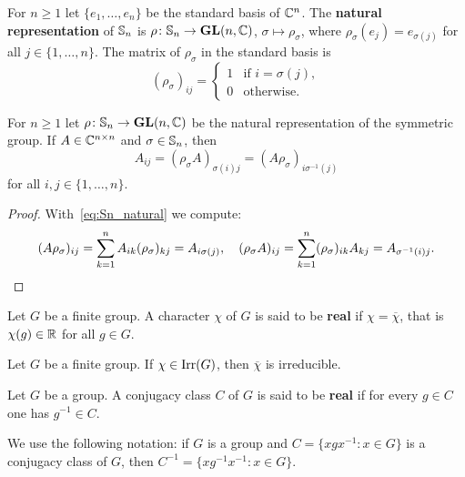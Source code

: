 For $n\geq1$ let $\{e_1,\dots,e_n\}$ be the standard basis of $\mathbb{C}^n$.  
The \textbf{natural representation} of $\mathbb{S}_n$ is 
$\rho\colon\mathbb{S}_n\to\mathbf{GL}(n,\mathbb{C})$, $\sigma\mapsto\rho_{\sigma}$, 
where $\rho_\sigma(e_j)=e_{\sigma(j)}$ for all $j\in\{1,\dots,n\}$. 
The matrix of $\rho_\sigma$ in the standard basis is  
\begin{equation}
    \label{eq:Sn_natural}
    (\rho_\sigma)_{ij}=\begin{cases}
      1 & \text{if $i=\sigma(j)$},\\
      0 & \text{otherwise}.
    \end{cases}
\end{equation}

\begin{lemma}
	\label{lem:permutaciones}
	For $n\geq1$ let $\rho\colon\mathbb{S}_n\to\mathbf{GL}(n,\mathbb{C})$ be the natural 
	representation of the symmetric group. 
	If $A\in\mathbb{C}^{n\times n}$ and $\sigma\in\mathbb{S}_n$, then
	\[
		A_{ij}=(\rho_{\sigma}A)_{\sigma(i)j}=(A\rho_{\sigma})_{i\sigma^{-1}(j)}
	\]
    for all $i,j\in\{1,\dots,n\}$.
\end{lemma}

\begin{proof}
	With~\eqref{eq:Sn_natural} we compute:
	\[
		(A\rho_{\sigma})_{ij}=\sum_{k=1}^n A_{ik}(\rho_{\sigma})_{kj}=A_{i\sigma(j)},
		\quad
		(\rho_\sigma A)_{ij}=\sum_{k=1}^n (\rho_\sigma)_{ik}A_{kj}=A_{\sigma^{-1}(i)j}.\qedhere
	\]
\end{proof}

\begin{definition}
  Let $G$ be a finite group. A character $\chi$ of $G$ is said to be
  \textbf{real} if
  $\chi=\overline{\chi}$, that is $\chi(g)\in\mathbb{R}$ for all $g\in G$. 
\end{definition}

\begin{exercise}
	\label{xca:chi_irreducible}
	Let $G$ be a finite group. If $\chi\in\operatorname{Irr}(G)$, then 
	$\overline{\chi}$ is irreducible.
\end{exercise}

\begin{definition}
  Let $G$ be a group. A conjugacy class $C$ of $G$ is said to be
  \textbf{real} if for every $g\in C$ one has $g^{-1}\in C$. 
\end{definition}

We use the following notation: if $G$ is a group and $C=\{xgx^{-1}:x\in G\}$ is a conjugacy class of  
$G$, then $C^{-1}=\{xg^{-1}x^{-1}:x\in G\}$.  

